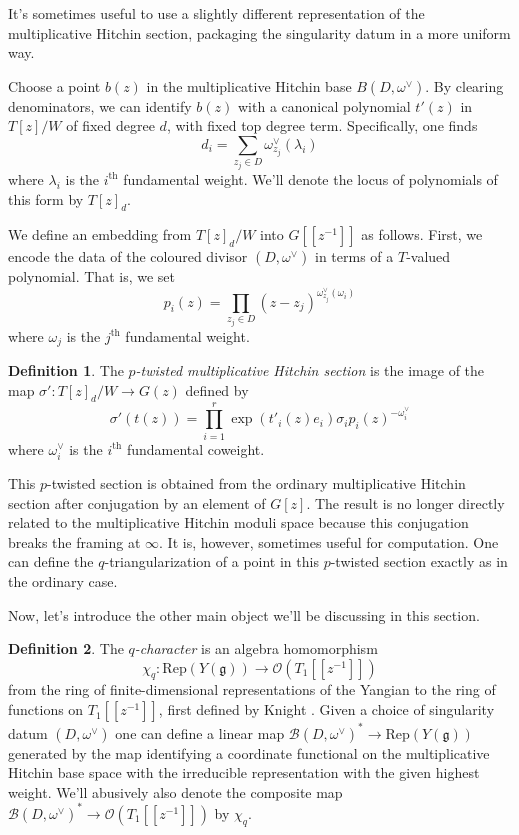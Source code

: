 \documentclass[11pt, oneside, reqno]{amsart}
\theoremstyle{definition} \newtheorem{definition}{Definition}[section]
\theoremstyle{definition} \newtheorem{remark}[definition]{Remark}
\theoremstyle{definition} \newtheorem{remarks}[definition]{Remarks}
\theoremstyle{definition} \newtheorem{question}[definition]{Question}
\theoremstyle{definition} \newtheorem*{note}{Note}
\theoremstyle{definition} \newtheorem{example}[definition]{Example}
\theoremstyle{definition} \newtheorem{examples}[definition]{Examples}
\renewcommand{\gg}{\mathfrak{g}}
\newcommand{\mr}[1]{\mathrm{#1}}
\newcommand{\mc}[1]{\mathcal{#1}}
\newcommand{\OO}{\mathcal{O}}
\begin{document}
It's sometimes useful to use a slightly different representation of the multiplicative Hitchin section, packaging the singularity datum in a more uniform way. 

Choose a point $b(z)$ in the multiplicative Hitchin base $B(D,\omega^\vee)$. By clearing denominators, we can identify $b(z)$ with a canonical polynomial $t'(z)$ in $T[z]/W$ of fixed degree $d$, with fixed top degree term.  Specifically, one finds
\[d_i = \sum_{z_j \in D} \omega^\vee_{z_j}(\lambda_i)\]
where $\lambda_i$ is the $i^\text{th}$ fundamental weight.  We'll denote the locus of polynomials of this form by $T[z]_d$.

We define an embedding from $T[z]_d/W$ into $G[[z^{-1}]]$ as follows.  First, we encode the data of the coloured divisor $(D, \omega^\vee)$ in terms of a $T$-valued polynomial.  That is, we set 
\[p_i(z) = \prod_{z_j \in D} (z-z_j)^{\omega^\vee_{z_j}(\omega_i)}\]
where $\omega_j$ is the $j^{\text{th}}$ fundamental weight.

\begin{definition}
The \emph{$p$-twisted multiplicative Hitchin section} is the image of the map $\sigma' \colon T[z]_d/W \to G(z)$ defined by
\begin{equation}
\label{eq:steinberg}
\sigma'(t(z)) = \prod_{i=1}^r \exp\left(t'_{i}(z) e_i\right) \sigma_i p_i(z)^{-\omega^\vee_i}
\end{equation}
where $\omega^\vee_i$ is the $i^\text{th}$ fundamental coweight.
\end{definition}

This $p$-twisted section is obtained from the ordinary multiplicative Hitchin section after conjugation by an element of $G[z]$.  The result is no longer directly related to the multiplicative Hitchin moduli space because this conjugation breaks the framing at $\infty$.  It is, however, sometimes useful for computation. One can define the $q$-triangularization of a point in this $p$-twisted section exactly as in the ordinary case.

Now, let's introduce the other main object we'll be discussing in this section.
 
\begin{definition}
The \emph{$q$-character} is an algebra homomorphism 
\[\chi_q \colon \mr{Rep}(Y(\gg)) \to \OO(T_1[[z^{-1}]])\]
from the ring of finite-dimensional representations of the Yangian to the ring of functions on $T_1[[z^{-1}]]$, first defined by Knight \cite{Knight}.  Given a choice of singularity datum $(D,\omega^\vee)$ one can define a linear map $\mc B(D, \omega^\vee)^* \to \mr{Rep}(Y(\gg))$ generated by the map identifying a coordinate functional on the multiplicative Hitchin base space with the irreducible representation with the given highest weight.  We'll abusively also denote the composite map $\mc B(D, \omega^\vee)^* \to \OO(T_1[[z^{-1}]])$ by $\chi_q$.
\end{definition}
\end{document}
